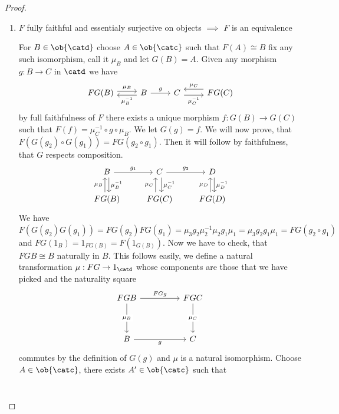 \begin{proof}[Proof]
\begin{enumerate}
	\item $F$ fully faithful and essentialy surjective on objects $\implies$ $F$ is an equivalence
	\par
	For $B\in\ob{\catd}$ choose $A\in\ob{\catc}$ such that $F(A)\cong B$ fix any such
	isomorphism, call it $\mu_B$ and let 
	$G(B)=A$. Given any morphism $g: B \to C$ in $\catd$ we have
	\[\begin{tikzcd}
	{FG(B)} & B & C & {FG(C)}
	\arrow["{{\mu_B}}", shift left, from=1-1, to=1-2]
	\arrow["{{\mu_B^{-1}}}", shift left, from=1-2, to=1-1]
	\arrow["g", from=1-2, to=1-3]
	\arrow["{{\mu_C^{-1}}}"', shift right, from=1-3, to=1-4]
	\arrow["{{\mu_C}}"', shift right=2, from=1-4, to=1-3]
\end{tikzcd}\]
	by full faithfulness of $F$ there exists a unique morphism
	$f: G(B) \to G(C)$ such that $F(f) = \mu_C^{-1}\circ g \circ \mu_B$. We let
	$G(g) = f$. We will now prove, that $F(G(g_2)\circ G(g_1)) = FG(g_2\circ g_1)$. Then
	it will follow by faithfulness, that $G$ respects composition.
\[\begin{tikzcd}
	B & C & D \\
	{FG(B)} & {FG(C)} & {FG(D)}
	\arrow["{{g_1}}", from=1-1, to=1-2]
	\arrow["{{\mu_B^{-1}}}", shift left, from=1-1, to=2-1]
	\arrow["{{g_2}}", from=1-2, to=1-3]
	\arrow["{{\mu_C^{-1}}}", shift left, from=1-2, to=2-2]
	\arrow["{{\mu_D^{-1}}}", shift left, from=1-3, to=2-3]
	\arrow["{{\mu_B}}", shift left, from=2-1, to=1-1]
	\arrow["{{\mu_C}}", shift left=2, from=2-2, to=1-2]
	\arrow["{{\mu_D}}", shift left, from=2-3, to=1-3]
\end{tikzcd}\]
	We have $F(G(g_2) G(g_1))=FG(g_2) FG(g_1)
	= \mu_3 g_2 \mu_2^{-1} \mu_2 g_1 \mu_1 = \mu_3 g_2 g_1 \mu_1
	= FG(g_2\circ g_1)$ and $FG(1_B) = 1_{FG(B)} = F(1_{G(B)})$.
	Now we have to check, that $FGB\cong B$ naturally in $B$. This follows
	easily, we define a natural transformation $\mu : FG \to 1_\catd$ whose
	components are those that we have picked and the naturality square
	\[\begin{tikzcd}
	FGB && FGC \\
	\\
	B && C
	\arrow["FGg", from=1-1, to=1-3]
	\arrow["{\mu_B}"{description}, from=1-1, to=3-1]
	\arrow["{\mu_C}"{description}, from=1-3, to=3-3]
	\arrow["g"', from=3-1, to=3-3]
\end{tikzcd}\]
	commutes by the definition of $G(g)$ and $\mu$ is a natural isomorphism.
	Choose $A\in\ob{\catc}$, there exists $A'\in\ob{\catc}$ such that
	\[\begin{tikzcd}

\end{tikzcd}\]
\end{enumerate}
\end{proof}

